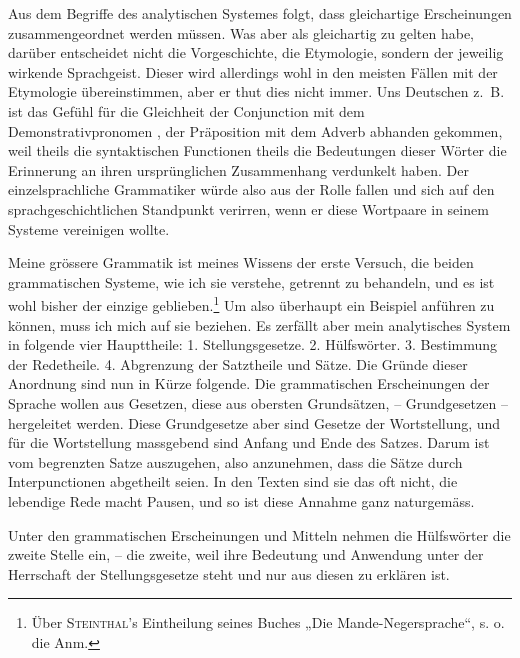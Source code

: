 \begin{sloppypar}Aus dem Begriffe des analytischen Systemes folgt, dass gleichartige Erscheinungen zusammengeordnet werden müssen. Was aber als gleichartig zu gelten habe, darüber entscheidet nicht die Vorgeschichte, die Etymologie, sondern der jeweilig wirkende Sprachgeist. Dieser wird allerdings wohl in den meisten Fällen mit der Etymologie übereinstimmen, aber er thut dies nicht immer. Uns Deutschen z.~B. ist das Gefühl für die Gleichheit  der Conjunction  mit dem Demonstrativpronomen ,  der Präposition  mit dem Adverb  abhanden gekommen, weil theils die syntaktischen Functionen theils die Bedeutungen dieser Wörter die Erinnerung an ihren ursprünglichen Zusammenhang verdunkelt haben. Der einzelsprachliche Grammatiker würde also aus der Rolle fallen und sich auf den sprachgeschichtlichen Standpunkt verirren, wenn er diese Wortpaare in seinem Systeme vereinigen wollte.\end{sloppypar}

Meine grössere  Grammatik ist meines Wissens der erste Versuch, die beiden grammatischen Systeme, wie ich sie verstehe, getrennt zu behandeln, und es ist wohl bisher der einzige geblieben.\footnote{Über \textsc{Steinthal}’s Eintheilung seines Buches „Die Mande-Negersprache“, s. o. die Anm. } Um also überhaupt ein Beispiel anführen zu können, muss ich mich auf \label{fp.93} sie beziehen. Es zerfällt aber mein analytisches System in folgende vier Haupttheile: 1. Stellungsgesetze. 2. Hülfswörter. 3. Bestimmung der Redetheile. 4. Abgrenzung der Satztheile und Sätze. Die Gründe dieser Anordnung sind nun in Kürze folgende. Die grammatischen Erscheinungen der Sprache wollen aus Gesetzen, diese aus obersten Grundsätzen, – Grundgesetzen – hergeleitet werden. Diese Grundgesetze aber sind Gesetze der Wortstellung, und für die Wortstellung massgebend sind Anfang und Ende \label{sp.91} des Satzes. Darum ist vom begrenzten Satze auszugehen, also anzunehmen, dass die Sätze durch Interpunctionen abgetheilt seien. In den Texten sind sie das oft nicht, die lebendige Rede macht  Pausen, und so ist diese Annahme ganz naturgemäss.

Unter den grammatischen Erscheinungen und Mitteln nehmen die Hülfswörter die zweite Stelle ein, – die zweite, weil ihre Bedeutung und Anwendung unter der Herrschaft der Stellungsgesetze steht und nur aus diesen zu erklären ist.

